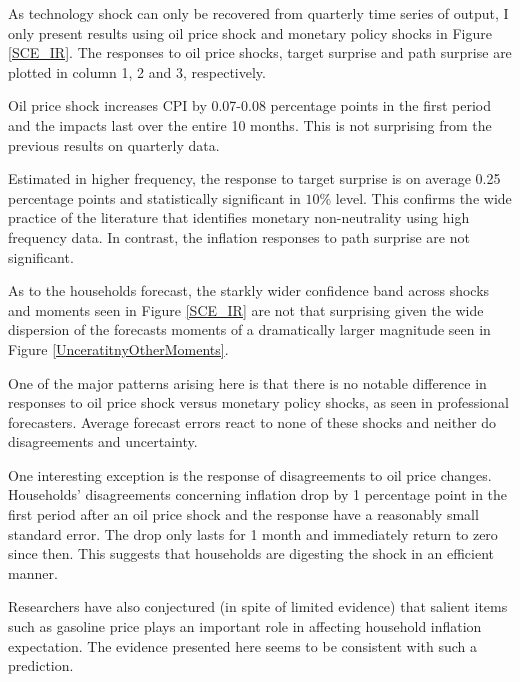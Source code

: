 \documentclass[]{article}
\begin{document}
	As technology shock can only be recovered from quarterly time series of output, I only present results using oil price shock and monetary policy shocks in Figure \ref{SCE_IR}. The responses to oil price shocks, target surprise and path surprise are plotted in column 1, 2 and 3, respectively. 
	
	Oil price shock increases CPI by 0.07-0.08 percentage points in the first period and the impacts last over the entire 10 months. This is not surprising from the previous results on quarterly data. 
	
	Estimated in higher frequency, the response to target surprise is on average 0.25 percentage points and statistically significant in $10\%$ level. This confirms the wide practice of the literature that identifies monetary non-neutrality using high frequency data. In contrast, the inflation responses to path surprise are not significant. 
	
	As to the households forecast, the starkly wider confidence band across  shocks and moments seen in Figure \ref{SCE_IR} are not that surprising given the wide dispersion of the forecasts moments of a dramatically larger magnitude seen in Figure \ref{UnceratitnyOtherMoments}.  
	
	One of the major patterns arising here is that there is no notable difference in responses to oil price shock versus monetary policy shocks, as seen in professional forecasters.  Average forecast errors react to none of these shocks and neither do disagreements and uncertainty.  
	
	One interesting exception is the response of disagreements to oil price changes. Households' disagreements concerning inflation drop by 1 percentage point in the first period after an oil price shock and the response have a reasonably small standard error. The drop only lasts for 1 month and immediately return to zero since then. This suggests that households are digesting the shock in an efficient manner.  
	
	Researchers have also conjectured (in spite of limited evidence) that salient items such as gasoline price plays an important role in affecting household inflation expectation. The evidence presented here seems to be consistent with such a prediction. 
	
	
	
\end{document}
